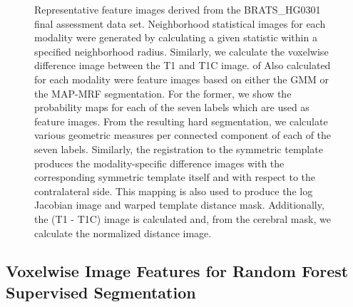 \documentclass[preprint,authoryear,review,12pt]{elsarticle}
\begin{document}
\begin{figure}
\centering
  \caption{Representative feature images derived from the 
           BRATS\_HG0301  final assessment data set.
           Neighborhood statistical images for each modality were 
           generated by calculating a given statistic within
           a specified neighborhood radius.  Similarly, we 
           calculate the voxelwise difference image between the
           T1 and T1C image.  
           of 
           Also calculated for each modality were feature
           images based on either the GMM or the MAP-MRF segmentation.  For the former, we
           show the probability maps for each of the seven labels which are used as feature
           images.  From the resulting hard segmentation, we calculate various geometric 
           measures per connected component of each of the seven labels.  Similarly, the 
           registration to the symmetric template produces the modality-specific 
           difference images with the
           corresponding symmetric template itself and with respect to the 
           contralateral side.   This mapping is also used to produce the log Jacobian image
           and warped template distance mask.  Additionally, the 
           (T1 - T1C) image is calculated and, from the
           cerebral mask, we calculate the normalized distance image.  
           }
  \label{fig:featureImages}         
\end{figure}

\subsection{Voxelwise Image Features for Random Forest Supervised Segmentation}
\end{document}
